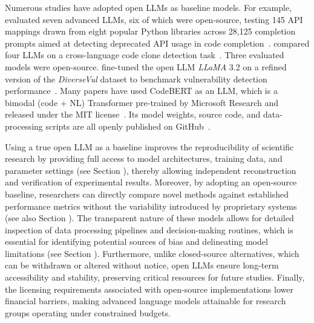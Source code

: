 
Numerous studies have adopted open LLMs as baseline models.
For example, \citeauthor{wang2024and} evaluated seven advanced LLMs, six of which were open-source, testing 145 API mappings drawn from eight popular Python libraries across 28,125 completion prompts aimed at detecting deprecated API usage in code completion~\cite{wang2024and}.
\citeauthor{moumoula2024large} compared four LLMs on a cross-language code clone detection task~\cite{moumoula2024large}.
Three evaluated models were open-source.
\citeauthor{gonccalves2025evaluating} fine-tuned the open LLM \emph{LLaMA} 3.2 on a refined version of the \emph{DiverseVul} dataset to benchmark vulnerability detection performance~\cite{gonccalves2025evaluating}.
Many papers have used CodeBERT as an LLM, which is a bimodal (code + NL) Transformer pre-trained by Microsoft Research and released under the MIT license~\cite{DBLP:journals/jss/YangZCZHC23, DBLP:conf/gaiis/XiaSD24, DBLP:conf/kbse/SonnekalbGBM22, DBLP:conf/icse/CaiYMMN24}.
Its model weights, source code, and data-processing scripts are all openly published on GitHub~\cite{codebert}.


Using a true open LLM as a baseline improves the reproducibility of scientific research by providing full access to model architectures, training data, and parameter settings (see Section \modelversion), thereby allowing independent reconstruction and verification of experimental results.
Moreover, by adopting an open-source baseline, researchers can directly compare novel methods against established performance metrics without the variability introduced by proprietary systems (see also Section \benchmarksmetrics).
The transparent nature of these models allows for detailed inspection of data processing pipelines and decision-making routines, which is essential for identifying potential sources of bias and delineating model limitations (see Section \limitationsmitigations).
Furthermore, unlike closed-source alternatives, which can be withdrawn or altered without notice, open LLMs ensure long-term accessibility and stability, preserving critical resources for future studies.
Finally, the licensing requirements associated with open-source implementations lower financial barriers, making advanced language models attainable for research groups operating under constrained budgets.


